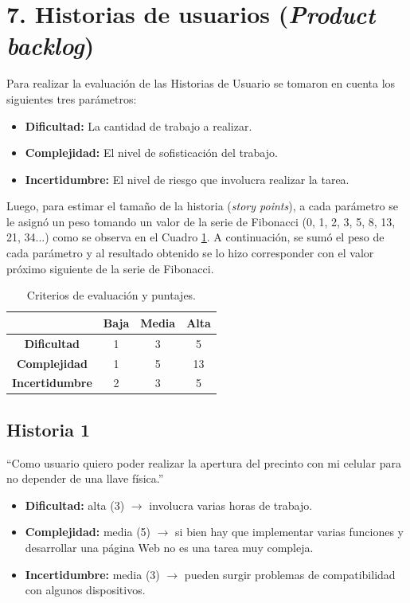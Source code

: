 \documentclass[
11pt, %
]{charter}
\begin{document}
\section{7. Historias de usuarios (\textit{Product backlog})}
\label{sec:backlog}

Para realizar la evaluación de las Historias de Usuario se tomaron en cuenta los siguientes tres parámetros: 

\begin{itemize}
	\item \textbf{Dificultad:} La cantidad de trabajo a realizar.
	\item \textbf{Complejidad:} El nivel de sofisticación del trabajo.
	\item \textbf{Incertidumbre:} El nivel de riesgo que involucra realizar la tarea.
\end{itemize}

Luego, para estimar el tamaño de la historia (\textit{story points}), a cada parámetro se le asignó un peso tomando un valor de la serie de Fibonacci (0, 1, 2, 3, 5, 8, 13, 21, 34...) como se observa en el Cuadro \ref{tab:criterios_evaluacion}. A continuación, se sumó el peso de cada parámetro y al resultado obtenido se lo hizo corresponder con el valor próximo siguiente de la serie de Fibonacci.

\begin{table}[ht]
\centering
\begin{tabular}{|c|c|c|c|}
\hline
           				& \textbf{Baja} & \textbf{Media}& \textbf{Alta}\\ \hline
\textbf{Dificultad} 	&	1   		&	3			&   5	\\ \hline
\textbf{Complejidad}	&	1			&	5			&	13 	\\ \hline
\textbf{Incertidumbre}	&   2   		&   3     		&  	5	\\ \hline
\end{tabular}
\caption{Criterios de evaluación y puntajes.}
\label{tab:criterios_evaluacion}
\end{table}

\subsection{Historia 1}
``Como usuario quiero poder realizar la apertura del precinto con mi celular para no depender de una llave física.''

\begin{itemize}
	\item \textbf{Dificultad:} alta (3) $\rightarrow$ involucra varias horas de trabajo.
	\item \textbf{Complejidad:} media (5) $\rightarrow$ si bien hay que implementar varias funciones y desarrollar una página Web no es una tarea muy compleja.
	\item \textbf{Incertidumbre:} media (3) $\rightarrow$ pueden surgir problemas de compatibilidad con algunos dispositivos.
\end{itemize}
\end{document}
